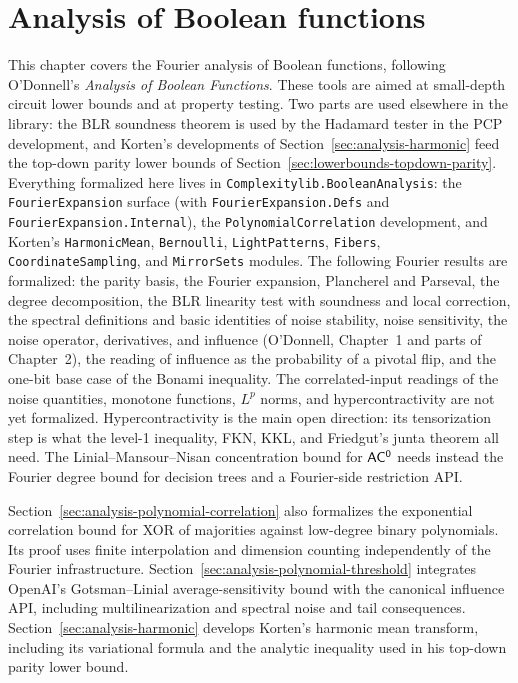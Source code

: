 \chapter{Analysis of Boolean functions}
\label{chap:analysis}

This chapter covers the Fourier analysis of Boolean functions, following
O'Donnell's \emph{Analysis of Boolean Functions}. These tools are aimed at
small-depth circuit lower bounds and at property testing. Two parts are used
elsewhere in the library: the BLR soundness theorem is used by the Hadamard
tester in the PCP development, and Korten's developments of
Section~\ref{sec:analysis-harmonic} feed the top-down parity lower bounds of
Section~\ref{sec:lowerbounds-topdown-parity}. Everything formalized here lives
in \texttt{Complexitylib.BooleanAnalysis}: the \texttt{FourierExpansion}
surface (with \texttt{FourierExpansion.Defs} and
\texttt{FourierExpansion.Internal}), the \texttt{PolynomialCorrelation}
development, and Korten's \texttt{HarmonicMean}, \texttt{Bernoulli},
\texttt{LightPatterns}, \texttt{Fibers}, \texttt{CoordinateSampling}, and
\texttt{MirrorSets} modules. The following Fourier results are formalized:
the parity basis, the Fourier expansion, Plancherel and Parseval, the degree
decomposition, the BLR linearity test with soundness and local correction, the
spectral definitions and basic identities of noise stability, noise
sensitivity, the noise operator, derivatives, and influence (O'Donnell,
Chapter~1 and parts of Chapter~2), the reading of influence as the probability
of a pivotal flip, and the one-bit base case of the Bonami inequality. The
correlated-input readings of the noise quantities, monotone functions, $L^p$
norms, and hypercontractivity are not yet formalized. Hypercontractivity is the
main open direction: its tensorization step is what the level-1 inequality,
FKN, KKL, and Friedgut's junta theorem all need. The Linial--Mansour--Nisan
concentration bound for $\mathsf{AC^0}$ needs instead the Fourier degree bound for
decision trees and a Fourier-side restriction API.

Section~\ref{sec:analysis-polynomial-correlation} also formalizes the exponential
correlation bound for XOR of majorities against low-degree binary polynomials.
Its proof uses finite interpolation and dimension counting independently of
the Fourier infrastructure.
Section~\ref{sec:analysis-polynomial-threshold} integrates OpenAI's
Gotsman--Linial average-sensitivity bound with the canonical influence API,
including multilinearization and spectral noise and tail consequences.
Section~\ref{sec:analysis-harmonic} develops Korten's harmonic mean transform,
including its variational formula and the analytic inequality used in his
top-down parity lower bound.

